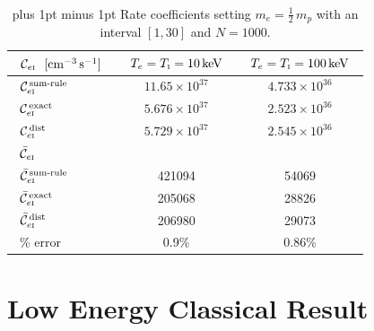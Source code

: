 \documentclass[preprint,12pt,eqsecnum,nofootinbib,amsmath,amssymb]{revtex4}
\newcommand{\smI}{{\rm\scriptscriptstyle I}}
\newcommand{\footnoteskip}{\baselineskip 12pt plus 1pt minus 1pt}
\begin{document}
~
\vskip-0.3cm 
\begin{table}[hb!]
\caption{\footnoteskip 
    Rate coefficients setting $m_e=\frac{1}{2}\, m_p$ with an interval
    $[1,30]$ and $N=1000$. 
}
\begin{tabular}{|l||c|c|} \hline
   ~${\cal C}_{e\smI} ~~{\rm [cm^{-3} \,s^{-1}] }$~ & ~$T_e=T_\smI=10\,{\rm keV}$~     & ~$T_e=T_\smI=100\,{\rm keV}$~\\ \hline
   ~${\cal C}_{e\smI}^\text{\,sum-rule}$~             & ~$11.65 \times 10^{37}$~       & ~$4.733 \times 10^{36}$~     \\
   ~${\cal C}_{e\smI}^\text{\,exact}$~                & ~$5.676 \times 10^{37}$~       & ~$2.523 \times 10^{36}$~     \\
   ~${\cal C}_{e\smI}^\text{\,dist}$~                 & ~$5.729 \times 10^{37}$~       & ~$2.545 \times 10^{36}$~     \\\hline\hline
   ~$\bar{\cal C}_{e\smI} $~                        &      & \\\hline
   ~$\bar{\cal C}_{e\smI}^\text{\,sum-rule}$~         & ~421094~         & ~54069~     \\
   ~$\bar{\cal C}_{e\smI}^\text{\,exact}$~            & ~205068~         & ~28826~     \\
   ~$\bar{\cal C}_{e\smI}^\text{\,dist}$~             & ~206980~         & ~29073~     \\\hline
   ~\% error~                                         & ~0.9\%~         & ~0.86\%~     \\\hline
\end{tabular} 
\label{table:fractAL3}
\end{table}



\pagebreak
\clearpage
\section{Low Energy Classical Result}
\end{document}
